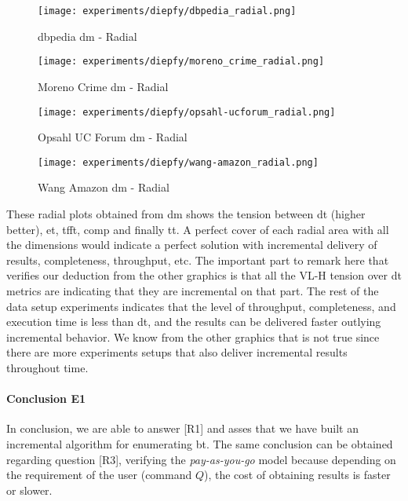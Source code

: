 \begin{figure}[!htb]
  \centering
  \begin{minipage}{0.5\textwidth}
   \texttt{[image: experiments/diepfy/dbpedia\_radial.png]}
    \caption{\acrshort{dbpedia} \acrshort{dm} - Radial}
    \label{fig:dief:dbpedia-radial}
  \end{minipage}%
  \begin{minipage}{0.5\textwidth}
   \texttt{[image: experiments/diepfy/moreno\_crime\_radial.png]}
    \caption{Moreno Crime \acrshort{dm} - Radial}
    \label{fig:dief:moreno-radial}
  \end{minipage}
\end{figure}
%
\begin{figure}[!htb]
  \centering
  \begin{minipage}{0.5\textwidth}
   \texttt{[image: experiments/diepfy/opsahl-ucforum\_radial.png]}
    \caption{Opsahl UC Forum \acrshort{dm} - Radial}
    \label{fig:dief:opsahl-radial}
  \end{minipage}%
  \begin{minipage}{0.5\textwidth}
    \texttt{[image: experiments/diepfy/wang-amazon\_radial.png]}
     \caption{Wang Amazon \acrshort{dm} - Radial}
     \label{fig:dief:wang-radial}
   \end{minipage}
 \end{figure}

These radial plots obtained from \acrshort{dm} shows the tension between \acrfull{dt} (higher better),
\acrfull{et}, \acrfull{tfft}, \acrfull{comp} and finally \acrfull{tt}. A perfect cover of each radial area with all the dimensions would
indicate a perfect solution with incremental delivery of results, completeness, throughput, etc. The important part to remark here that verifies
our deduction from the other graphics is that all the VL-H tension over \acrshort{dt} metrics are indicating that they are incremental on that part. 
The rest of the data setup experiments indicates that the level of throughput, completeness, and execution time is less than \acrfull{dt}, and the results can be delivered faster outlying incremental behavior. 
We know from the other graphics that is not true since there are more experiments setups that also deliver incremental results throughout time.

\paragraph{Conclusion E1} In conclusion, we are able to answer [R1] and asses that we have built an incremental algorithm for enumerating \acrlong{bt}. 
The same conclusion can be obtained regarding question [R3], verifying the \emph{pay-as-you-go} model because depending on the requirement of the user (command $Q$), the cost of obtaining results is faster or slower.

